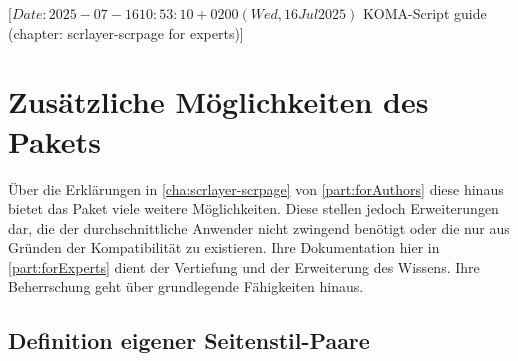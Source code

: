 %
%
%
%
%
%
%

%
                 [$Date: 2025-07-16 10:53:10 +0200 (Wed, 16 Jul 2025) $
                  KOMA-Script guide (chapter: scrlayer-scrpage for experts)]

\chapter[{Zusätzliche Möglichkeiten von \Package{scrlayer-scrpage}}]
{Zusätzliche Möglichkeiten des
  Pakets
  }
%
\BeginIndexGroup
{}%
Über die Erklärungen in \autoref{cha:scrlayer-scrpage} von
\autoref{part:forAuthors} diese hinaus bietet
das Paket  viele weitere Möglichkeiten. Diese
stellen jedoch Erweiterungen dar, die der durchschnittliche Anwender
nicht zwingend benötigt oder die nur aus Gründen der Kompatibilität zu
 existieren. Ihre Dokumentation hier in
\autoref{part:forExperts} dient der Vertiefung und der Erweiterung des
Wissens. Ihre Beherrschung geht über grundlegende Fähigkeiten hinaus.


\section{Definition eigener Seitenstil-Paare}

